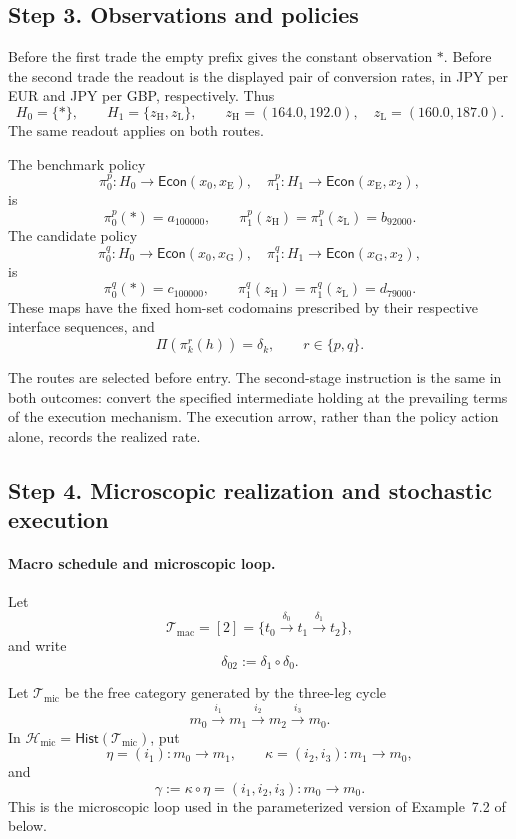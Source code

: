 \documentclass[11pt,a4paper]{article}
\newcommand{\Econ}{\mathsf{Econ}}
\newcommand{\Hist}{\mathsf{Hist}}
\newcommand{\Tmic}{\mathcal T_{\mathrm{mic}}}
\newcommand{\Tmac}{\mathcal T_{\mathrm{mac}}}
\newcommand{\Hmic}{\mathcal H_{\mathrm{mic}}}
\begin{document}
\subsection{Step 3. Observations and policies}


Before the first trade the empty prefix gives the constant observation $*$.
Before the second trade the readout is the displayed pair of conversion
rates, in JPY per EUR and JPY per GBP, respectively. Thus
\[
  H_0=\{*\},\qquad
  H_1=\{z_{\mathrm H},z_{\mathrm L}\},\qquad
  z_{\mathrm H}=(164.0,192.0),\quad z_{\mathrm L}=(160.0,187.0).
\]
The same readout applies on both routes.

The benchmark policy 
\[
\pi^p_0 : H_0 \to \Econ(x_0, x_{\mathrm E}),
	\quad
\pi^p_1 : H_1 \to \Econ(x_{\mathrm E}, x_2),
\]
is
\[
  \pi_0^p(*)=a_{100000},
  \qquad
  \pi_1^p(z_{\mathrm H})=\pi_1^p(z_{\mathrm L})=b_{92000}.
\]
The candidate policy
\[
\pi^q_0 : H_0 \to \Econ(x_0, x_{\mathrm G}),
	\quad
\pi^q_1 : H_1 \to \Econ(x_{\mathrm G}, x_2),
\]
is
\[
  \pi_0^q(*)=c_{100000},
  \qquad
  \pi_1^q(z_{\mathrm H})=\pi_1^q(z_{\mathrm L})=d_{79000}.
\]
These maps have the fixed hom-set codomains prescribed by their
respective interface sequences, and
\[
  \Pi(\pi_k^r(h))=\delta_k,
  \qquad r\in\{p,q\}.
\]

The routes are selected before entry.
The second-stage instruction is the same in both outcomes:
convert the specified intermediate holding at the prevailing
terms of the execution mechanism.
The execution arrow, rather than the policy action alone,
records the realized rate.

\subsection{Step 4. Microscopic realization and stochastic execution}

\paragraph{Macro schedule and microscopic loop.}
Let
\[
  \Tmac=[2]
  =\{t_0\xrightarrow{\delta_0}t_1
                 \xrightarrow{\delta_1}t_2\},
\]
and write
\[
  \delta_{02}:=\delta_1\circ\delta_0.
\]

Let $\Tmic$ be the free category generated by the three-leg cycle
\[
  m_0\xrightarrow{i_1}m_1
  \xrightarrow{i_2}m_2
  \xrightarrow{i_3}m_0.
\]
In $\Hmic=\Hist(\Tmic)$, put
\[
  \eta=(i_1):m_0\to m_1,
  \qquad
  \kappa=(i_2,i_3):m_1\to m_0,
\]
and
\[
  \gamma:=\kappa\circ\eta
  =(i_1,i_2,i_3):m_0\to m_0.
\]
This is the microscopic loop used in the parameterized version of
Example~7.2 of \cite{AdachiHaraAB} below.
\end{document}
